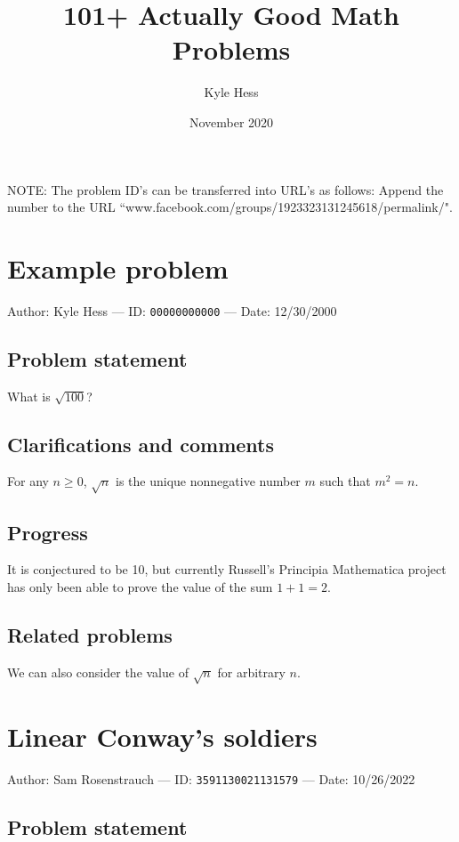 \documentclass[10pt]{article}
\title{101+ Actually Good Math Problems}
\author{Kyle Hess}
\date{November 2020}
\begin{document}
\maketitle

NOTE: The problem ID's can be transferred into URL's as follows: Append the number to the URL ``www.facebook.com/groups/1923323131245618/permalink/".

\section{Example problem}

Author: Kyle Hess --- ID: \verb`00000000000` --- Date: 12/30/2000

\subsection{Problem statement}

What is $\sqrt{100}$?

\subsection{Clarifications and comments}

For any $n\geq 0$, $\sqrt{n}$ is the unique nonnegative number $m$ such that $m^2=n$.

\subsection{Progress}

It is conjectured to be 10, but currently Russell's Principia Mathematica project has only been able to prove the value of the sum $1+1=2$.

\subsection{Related problems}

We can also consider the value of $\sqrt{n}$ for arbitrary $n$.

\pagebreak

\section{Linear Conway's soldiers}

Author: Sam Rosenstrauch --- ID: \verb`3591130021131579` --- Date: 10/26/2022

\subsection{Problem statement}
\end{document}
